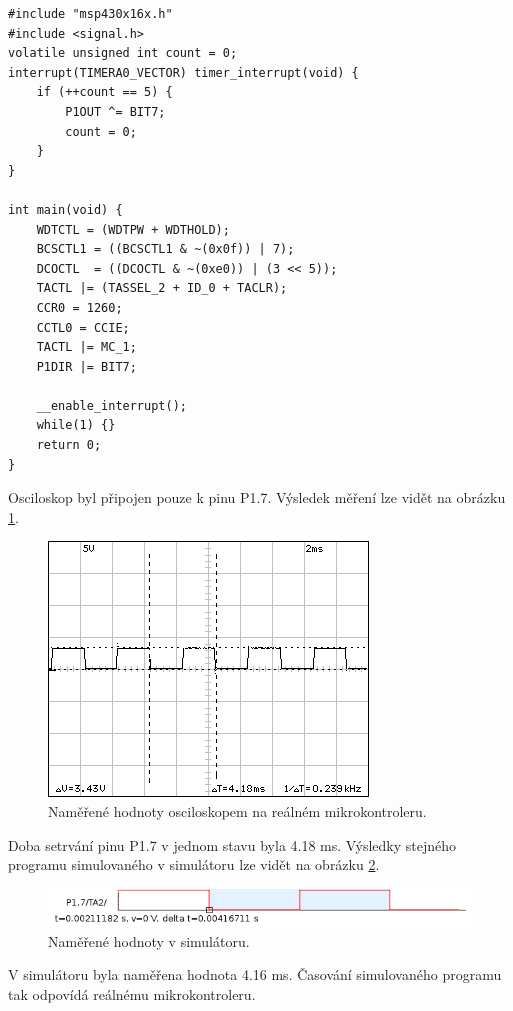 \lstset{language=XML, numbers=left, frame=single, breaklines=true, tabsize=2, xleftmargin=20pt}
\begin{lstlisting}
#include "msp430x16x.h"
#include <signal.h>
volatile unsigned int count = 0;
interrupt(TIMERA0_VECTOR) timer_interrupt(void) {
	if (++count == 5) {
		P1OUT ^= BIT7;
		count = 0;
	}
}

int main(void) {
	WDTCTL = (WDTPW + WDTHOLD);
	BCSCTL1 = ((BCSCTL1 & ~(0x0f)) | 7);
	DCOCTL  = ((DCOCTL & ~(0xe0)) | (3 << 5));
	TACTL |= (TASSEL_2 + ID_0 + TACLR);
	CCR0 = 1260;
	CCTL0 = CCIE;
	TACTL |= MC_1;
	P1DIR |= BIT7;

	__enable_interrupt();
	while(1) {}
	return 0;
}

\end{lstlisting}

Osciloskop byl připojen pouze k pinu P1.7. Výsledek měření lze vidět na obrázku \ref{fig:dso06osc}.

\begin{figure}[ht]
\centering
\includegraphics[trim=0cm 0cm 0cm 0cm]{fig/dso06}
\caption{Naměřené hodnoty osciloskopem na reálném mikrokontroleru.}
\label{fig:dso06osc}
\end{figure}

Doba setrvání pinu P1.7 v jednom stavu byla 4.18 ms. Výsledky stejného programu simulovaného v simulátoru lze vidět na obrázku \ref{fig:dso06sim}.

\begin{figure}[ht]
\centering
\includegraphics[trim=0cm 0cm 0cm 0cm, scale=0.8]{fig/dso06sim}
\caption{Naměřené hodnoty v simulátoru.}
\label{fig:dso06sim}
\end{figure}

V simulátoru byla naměřena hodnota 4.16 ms. Časování simulovaného programu tak odpovídá reálnému mikrokontroleru.

